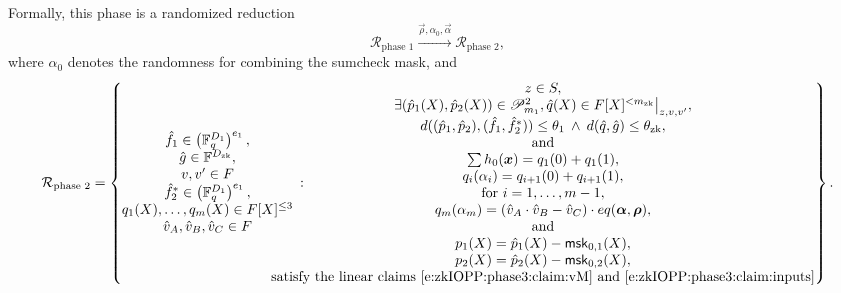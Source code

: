 Formally, this phase is a randomized reduction 
\[
\mathcal R_\text{phase 1} \stackrel{\vec\rho, \alpha_0,\vec\alpha}{\longrightarrow} \mathcal R_\text{phase 2},
\]
where $\alpha_0$ denotes the randomness for combining the sumcheck mask, and
\begin{equation}
\mathcal R_\text{phase 2} =
\left\{
    \begin{matrix}
        \hat f_1 \in \left(\mathbb F_q^{D_1}\right)^{e_1},
        \\
        \hat g \in \mathbb F^{D_\text{zk}},
        \\
        v, v' \in F
        \\
        \hat f_2^* \in \left(\mathbb F_q^{D_1}\right)^{e_1},
        \\
        q_1(X), \ldots, q_m(X) \in F[X]^{\leq 3}
        \\
        \hat v_A, \hat v_B, \hat v_C \in F
    \end{matrix}
    \::\:
    \hspace*{-10mm}
    \begin{matrix}
        z\in S,
        \\
        \exists (\hat p_1(X),\hat p_2(X)) \in \mathscr P_{m_1}^2, 
        \hat q(X) \in F[X]^{< m_\text{zk}}\big|_{z,v,v'},
        \\
        d((\hat p_1, \hat p_2), (\hat f_1,\hat f_2^*)) \leq \theta_1
        \:\wedge \: 
        d(\hat q, \hat g)\leq \theta_\text{zk},
        \\
        \text{and}
        \\
        \sum h_0(\vec x) = q_1(0) + q_1(1),
        \\
        q_i(\alpha_i) = q_{i+1}(0) + q_{i+1}(1),
        \\
        \text{for }i = 1,\ldots, m-1,
        \\
        q_m(\alpha_m) = (\hat v_A \cdot \hat v_B - \hat v_C)\cdot eq(\vec\alpha, \vec\rho),
        \\
        \text{and}
        \\
        p_1(X) = \hat p_1(X) - \msk_{0,1}(X), 
        \\ 
        p_2(X) = \hat p_2(X) - \msk_{0,2}(X),
        \\
        \text{satisfy the linear claims \eqref{e:zkIOPP:phase3:claim:vM} and \eqref{e:zkIOPP:phase3:claim:inputs}}
    \end{matrix}
\right\}.
\end{equation}






